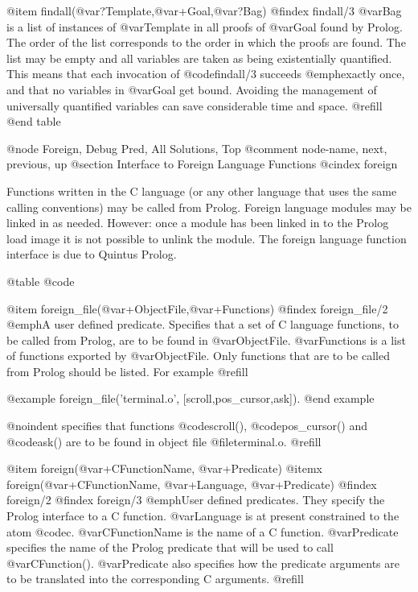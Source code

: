 @item findall(@var{?Template},@var{+Goal},@var{?Bag})
@findex findall/3
@var{Bag} is a list of instances of @var{Template} in all proofs of
@var{Goal} found by Prolog.  The order of the list corresponds to the
order in which the proofs are found.  The list may be empty and all
variables are taken as being existentially quantified.  This means that
each invocation of @code{findall/3} succeeds @emph{exactly once}, and
that no variables in @var{Goal} get bound.  Avoiding the management of
universally quantified variables can save considerable time and space.
@refill
@end table

@node Foreign, Debug Pred, All Solutions, Top
@comment  node-name,  next,  previous,  up
@section Interface to Foreign Language Functions
@cindex foreign

Functions written in the C language (or any other language that uses the
same calling conventions) may be called from Prolog.  Foreign language
modules may be linked in as needed.  However: once a module has been linked
in to the Prolog load image it is not possible to unlink the module.
The foreign language function interface is due to Quintus Prolog.

@table @code

@item foreign_file(@var{+ObjectFile},@var{+Functions})
@findex foreign_file/2
@emph{A user defined predicate.}
Specifies that a set of C language functions, to be called from Prolog,
are to be found in @var{ObjectFile}. @var{Functions} is a list of functions
exported by @var{ObjectFile}.  Only functions that are to be called from
Prolog should be listed.  For example @refill

@example
foreign_file('terminal.o', [scroll,pos_cursor,ask]).
@end example

@noindent
specifies that functions @code{scroll()}, @code{pos_cursor()} and
@code{ask()} are to be found in object file @file{terminal.o}. @refill

@item foreign(@var{+CFunctionName}, @var{+Predicate})
@itemx foreign(@var{+CFunctionName}, @var{+Language}, @var{+Predicate})
@findex foreign/2
@findex foreign/3
@emph{User defined predicates.} They specify the Prolog interface to a C
function. @var{Language} is at present constrained to the atom @code{c}.
@var{CFunctionName} is the name of a C function. @var{Predicate}
specifies the name of the Prolog predicate that will be used to call
@var{CFunction()}. @var{Predicate} also specifies how the predicate
arguments are to be translated into the corresponding C arguments.
@refill

